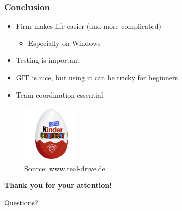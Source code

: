 \documentclass[t]{beamer}
\newlength{\Ku}
\begin{document}
\begin{frame}
  \frametitle{Conclusion}


\begin{itemize}
	\item Firm makes life easier (and more complicated)
	\begin{itemize}
		\item Especially on Windows
	\end{itemize}
	\item Testing is important
	\item GIT is nice, but using it can be tricky for beginners
	\item Team coordination essential
\end{itemize}

 {
\begin{figure}
\includegraphics[width=0.25\textwidth]{images/egg.jpg}
\caption{ Source: www.real-drive.de }
\label{fig:harps_example}
\end{figure}
}
\end{frame}


\begin{frame}
  \vspace*{20\Ku}
  \textbf{Thank you for your attention!}


  \vspace*{10\Ku}
  Questions?
\end{frame}
\end{document}
